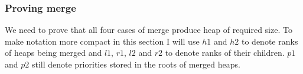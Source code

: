 \subsubsection{Proving merge}

We need to prove that all four cases of merge produce heap of required size. To make notation more compact in this section I will use $h1$ and $h2$ to denote ranks of heaps being merged and $l1$, $r1$, $l2$ and $r2$ to denote ranks of their children. $p1$ and $p2$ still denote priorities stored in the roots of merged heaps.











 